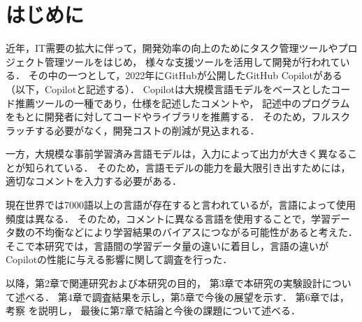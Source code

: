 \section{はじめに\label{intro}}
    近年，IT需要の拡大に伴って，開発効率の向上のためにタスク管理ツールやプロジェクト管理ツールをはじめ，
    様々な支援ツールを活用して開発が行われている．
    その中の一つとして，2022年にGitHubが公開したGitHub Copilotがある（以下，Copilotと記述する）．
    Copilotは大規模言語モデルをベースとしたコード推薦ツールの一種であり，仕様を記述したコメントや，
    記述中のプログラムをもとに開発者に対してコードやライブラリを推薦する．
    そのため，フルスクラッチする必要がなく，開発コストの削減が見込まれる．

    一方，大規模な事前学習済み言語モデルは，入力によって出力が大きく異なることが知られている\cite{Yao2022ACL}．
    そのため，言語モデルの能力を最大限引き出すためには，適切なコメントを入力する必要がある．
    
    現在世界では7000語以上の言語が存在する\cite{Ethnologue}と言われているが，言語によって使用頻度は異なる．
    そのため，コメントに異なる言語を使用することで，学習データ数の不均衡などにより学習結果のバイアスにつながる可能性があると考えた．
    そこで本研究では，言語間の学習データ量の違いに着目し，言語の違いがCopilotの性能に与える影響に関して調査を行った．

    以降，第2章で関連研究および本研究の目的，
    第3章で本研究の実験設計について述べる．
    第4章で調査結果を示し，第5章で今後の展望を示す．
    第6章では，考察%
    を説明し，
    最後に第7章で結論と今後の課題について述べる．
